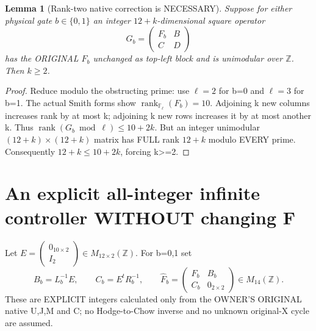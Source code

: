 \documentclass[11pt]{article}
\newtheorem{lemma}{Lemma}
\begin{document}
\begin{lemma}[Rank-two native correction is NECESSARY]
Suppose for either physical gate \(b\in\{0,1\}\)
an integer \(12+k\)-dimensional square operator
\[
G_b=\begin{pmatrix}F_b&B\\C&D\end{pmatrix}
\]
has the ORIGINAL \(F_b\) unchanged as top-left
block and is unimodular over \(\mathbb Z\).
Then \(\boxed{k\ge2}\).
\end{lemma}
\begin{proof}
Reduce modulo the obstructing prime: use
\(\ell=2\) for b=0 and \(\ell=3\) for b=1.
The actual Smith forms show
\(\operatorname{rank}_{\mathbb F_\ell}(F_b)=10\).
Adjoining k new columns increases rank
by at most k; adjoining k new rows
increases it by at most another k.
Thus \(\operatorname{rank}(G_b\bmod\ell)
\le 10+2k\).
But an integer unimodular \((12+k)\times(12+k)\)
matrix has FULL rank \(12+k\) modulo EVERY prime.
Consequently \(12+k\le10+2k\), forcing k>=2.
\end{proof}

\section{An explicit all-integer infinite controller WITHOUT changing F}
Let \(E=\left(\begin{smallmatrix}0_{10\times2}\\I_2\end{smallmatrix}\right)\in
M_{12\times2}(\mathbb Z)\).
For b=0,1 set
\[
\boxed{
B_b=L_b^{-1}E,\qquad C_b=E^tR_b^{-1},
\qquad
\widehat F_b=
\begin{pmatrix}
 F_b&B_b\\ C_b&0_{2\times2}
\end{pmatrix}\in M_{14}(\mathbb Z).
}\tag{1}
\]
These are EXPLICIT integers calculated only
from the OWNER'S ORIGINAL native U,J,M and C;
no Hodge-to-Chow inverse and no unknown
original-X cycle are assumed.
\end{document}
